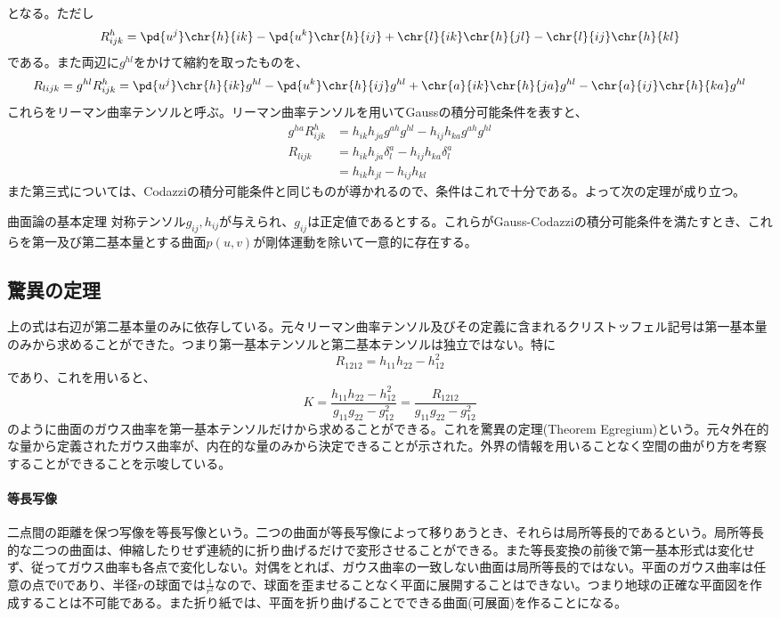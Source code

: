         となる。ただし
            \[R^h_{ijk} = \pd{u^j}\chr{h}{ik} - \pd{u^k}\chr{h}{ij} + \chr{l}{ik}\chr{h}{jl} - \chr{l}{ij}\chr{h}{kl}\]
        である。また両辺に$g^{hl}$をかけて縮約を取ったものを、
            \[R_{lijk} = g^{hl}R^h_{ijk} = \pd{u^j}\chr{h}{ik}g^{hl} - \pd{u^k}\chr{h}{ij}g^{hl} + \chr{a}{ik}\chr{h}{ja}g^{hl} - \chr{a}{ij}\chr{h}{ka}g^{hl}\]
        これらをリーマン曲率テンソルと呼ぶ。リーマン曲率テンソルを用いてGaussの積分可能条件を表すと、
        \begin{align*}
            g^{ha}R^h_{ijk} &= h_{ik}h_{ja}g^{ah}g^{hl} - h_{ij}h_{ka}g^{ah}g^{hl}\\
            R_{lijk} &= h_{ik}h_{ja}\delta_l^a - h_{ij}h_{ka}\delta_l^a\\
            &= h_{ik}h_{jl} - h_{ij}h_{kl}
        \end{align*}
        また第三式については、Codazziの積分可能条件と同じものが導かれるので、条件はこれで十分である。よって次の定理が成り立つ。
        \begin{thm}{曲面論の基本定理}
            対称テンソル$g_{ij}, h_{ij}$が与えられ、$g_{ij}$は正定値であるとする。これらがGauss-Codazziの積分可能条件を満たすとき、これらを第一及び第二基本量とする曲面$p(u,v)$が剛体運動を除いて一意的に存在する。
        \end{thm}


    \subsection{驚異の定理}
        上の式は右辺が第二基本量のみに依存している。元々リーマン曲率テンソル及びその定義に含まれるクリストッフェル記号は第一基本量のみから求めることができた。つまり第一基本テンソルと第二基本テンソルは独立ではない。特に
            \[R_{1212} = h_{11}h_{22} - h_{12}^2\]
        であり、これを用いると、
            \[K = \frac{h_{11}h_{22} - h_{12}^2}{g_{11}g_{22} - g_{12}^2} = \frac{R_{1212}}{g_{11}g_{22}-g_{12}^2}\]
        のように曲面のガウス曲率を第一基本テンソルだけから求めることができる。これを驚異の定理(Theorem Egregium)という。元々外在的な量から定義されたガウス曲率が、内在的な量のみから決定できることが示された。外界の情報を用いることなく空間の曲がり方を考察することができることを示唆している。


    \paragraph{等長写像}
        二点間の距離を保つ写像を等長写像という。二つの曲面が等長写像によって移りあうとき、それらは局所等長的であるという。局所等長的な二つの曲面は、伸縮したりせず連続的に折り曲げるだけで変形させることができる。また等長変換の前後で第一基本形式は変化せず、従ってガウス曲率も各点で変化しない。対偶をとれば、ガウス曲率の一致しない曲面は局所等長的ではない。平面のガウス曲率は任意の点で0であり、半径$r$の球面では$\frac{1}{r^2}$なので、球面を歪ませることなく平面に展開することはできない。つまり地球の正確な平面図を作成することは不可能である。また折り紙では、平面を折り曲げることでできる曲面(可展面)を作ることになる。
